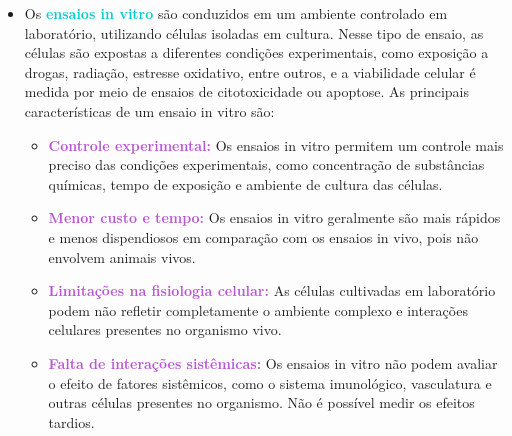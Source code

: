 \documentclass[11pt,a4paper]{article}
\begin{document}
	\begin{itemize}[label=\textcolor{CarnationPink}{$\blacktriangleright$}]
		\item Os \textcolor{DarkTurquoise}{\LobsterTwo\textbf{ensaios in vitro}} são conduzidos em um ambiente controlado em laboratório, utilizando células isoladas em cultura. Nesse tipo de ensaio, as células são expostas a diferentes condições experimentais, como exposição a drogas, radiação, estresse oxidativo, entre outros, e a viabilidade celular é medida por meio de ensaios de citotoxicidade ou apoptose. As principais características de um ensaio in vitro são:
		
		\begin{itemize}[label=\textcolor{CarnationPink}{$\star$}]
			\item \textcolor{MediumOrchid}{\textbf{Controle experimental:}} Os ensaios in vitro permitem um controle mais preciso das condições experimentais, como concentração de substâncias químicas, tempo de exposição e ambiente de cultura das células.
			\item \textcolor{MediumOrchid}{\textbf{Menor custo e tempo:}} Os ensaios in vitro geralmente são mais rápidos e menos dispendiosos em comparação com os ensaios in vivo, pois não envolvem animais vivos.
			\item \textcolor{MediumOrchid}{\textbf{Limitações na fisiologia celular:}} As células cultivadas em laboratório podem não refletir completamente o ambiente complexo e interações celulares presentes no organismo vivo.
			\item \textcolor{MediumOrchid}{\textbf{Falta de interações sistêmicas:}} Os ensaios in vitro não podem avaliar o efeito de fatores sistêmicos, como o sistema imunológico, vasculatura e outras células presentes no organismo. Não é possível medir os efeitos tardios.
		\end{itemize}
		

\end{itemize}
\end{document}
